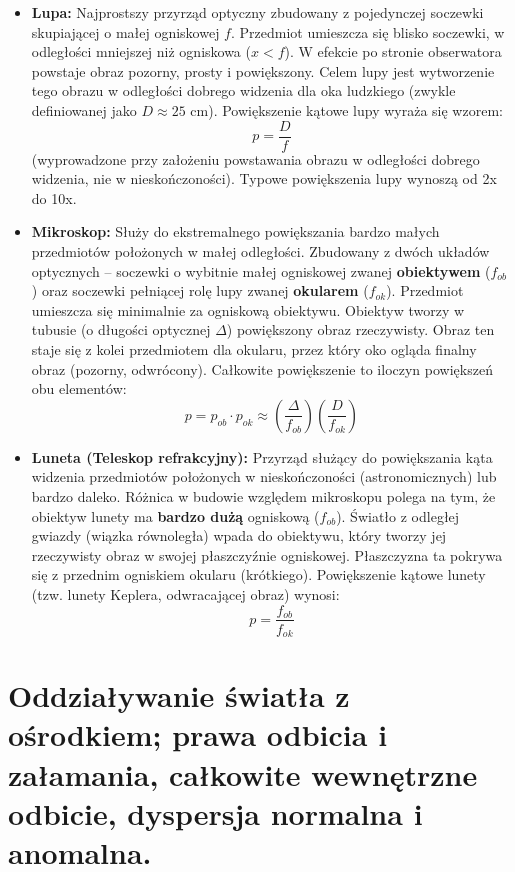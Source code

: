 \documentclass[11pt, a4paper]{article}
\begin{document}
\begin{itemize}
    \item \textbf{Lupa:} 
    Najprostszy przyrząd optyczny zbudowany z pojedynczej soczewki skupiającej o małej ogniskowej $f$. Przedmiot umieszcza się blisko soczewki, w odległości mniejszej niż ogniskowa ($x < f$). W efekcie po stronie obserwatora powstaje obraz pozorny, prosty i powiększony. Celem lupy jest wytworzenie tego obrazu w odległości dobrego widzenia dla oka ludzkiego (zwykle definiowanej jako $D \approx 25$ cm). Powiększenie kątowe lupy wyraża się wzorem:
    \[
    p = \frac{D}{f}
    \]
    (wyprowadzone przy założeniu powstawania obrazu w odległości dobrego widzenia, nie w nieskończoności). Typowe powiększenia lupy wynoszą od 2x do 10x.

    \item \textbf{Mikroskop:}
    Służy do ekstremalnego powiększania bardzo małych przedmiotów położonych w małej odległości. Zbudowany z dwóch układów optycznych – soczewki o wybitnie małej ogniskowej zwanej \textbf{obiektywem} ($f_{ob}$) oraz soczewki pełniącej rolę lupy zwanej \textbf{okularem} ($f_{ok}$). Przedmiot umieszcza się minimalnie za ogniskową obiektywu. Obiektyw tworzy w tubusie (o długości optycznej $\Delta$) powiększony obraz rzeczywisty. Obraz ten staje się z kolei przedmiotem dla okularu, przez który oko ogląda finalny obraz (pozorny, odwrócony). Całkowite powiększenie to iloczyn powiększeń obu elementów:
    \[
    p = p_{ob} \cdot p_{ok} \approx \left(\frac{\Delta}{f_{ob}}\right) \left(\frac{D}{f_{ok}}\right)
    \]

    \item \textbf{Luneta (Teleskop refrakcyjny):}
    Przyrząd służący do powiększania kąta widzenia przedmiotów położonych w nieskończoności (astronomicznych) lub bardzo daleko. Różnica w budowie względem mikroskopu polega na tym, że obiektyw lunety ma \textbf{bardzo dużą} ogniskową ($f_{ob}$). Światło z odległej gwiazdy (wiązka równoległa) wpada do obiektywu, który tworzy jej rzeczywisty obraz w swojej płaszczyźnie ogniskowej. Płaszczyzna ta pokrywa się z przednim ogniskiem okularu (krótkiego). Powiększenie kątowe lunety (tzw. lunety Keplera, odwracającej obraz) wynosi:
    \[
    p = \frac{f_{ob}}{f_{ok}}
    \]
\end{itemize}

\section{Oddziaływanie światła z ośrodkiem; prawa odbicia i załamania, całkowite wewnętrzne odbicie, dyspersja normalna i anomalna.}
\end{document}

